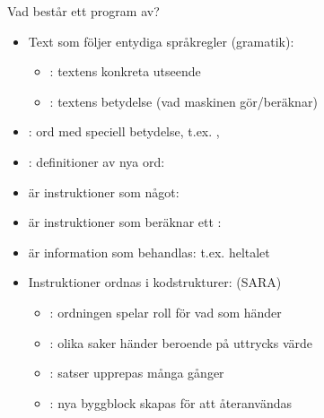 \begin{Slide}{Vad består ett program av?}
\begin{itemize}
\item Text som följer entydiga språkregler (gramatik):
\begin{itemize}
\item {}: textens konkreta utseende
\item {}: textens betydelse (vad maskinen gör/beräknar)
\end{itemize}
\item {}: ord med speciell betydelse, t.ex. , 
\item {}: definitioner av nya ord: 
\item {} är instruktioner som  något: 
\item {} är instruktioner som beräknar ett : 
\item {} är information som behandlas: t.ex. heltalet 
\item Instruktioner ordnas i kodstrukturer: (SARA)
\begin{itemize}
\item {}: ordningen spelar roll för vad som händer
\item {}: olika saker händer beroende på uttrycks värde
\item {}: satser upprepas många gånger
\item {}: nya byggblock skapas för att återanvändas
\end{itemize}
\end{itemize}
\end{Slide}

